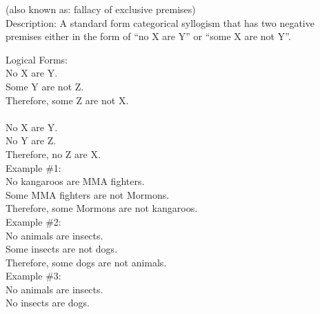 \documentclass[a4paper,12pt,single,pdftex]{scrartcl}
\begin{document}
      (also known as: fallacy of exclusive premises)
    \\

  
    Description: A standard form categorical syllogism that has two negative premises either in the form of  “no X are Y” or “some X are not Y”.

    
      Logical Forms:
    \\

    
      No X are Y.
    \\

    
      Some Y are not Z.
    \\

    
      Therefore, some Z are not X.
    \\

    
       
    \\

    
      No X are Y.
    \\

    
      No Y are Z.
    \\

    
      Therefore, no Z are X.
    \\

    
      Example \#1:
    \\

    
      No kangaroos are MMA fighters.
    \\

    
      Some MMA fighters are not Mormons.
    \\

    
      Therefore, some Mormons are not kangaroos.
    \\

    
      Example \#2:
    \\

    
      No animals are insects.
    \\

    
      Some insects are not dogs.
    \\

    
      Therefore, some dogs are not animals.
    \\

    
      Example \#3:
    \\

    
      No animals are insects.
    \\

    
      No insects are dogs.
    \\
\end{document}
